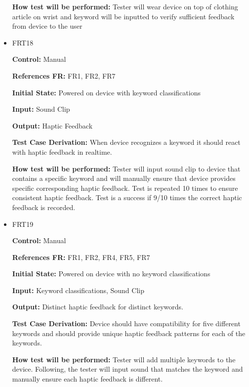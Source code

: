 \documentclass[12pt, titlepage]{article}
\begin{document}
\begin{itemize}
\textbf{How test will be performed:} Tester will wear device on top of clothing article on wrist and keyword will be inputted to verify sufficient feedback from device to the user


\item{FRT18}

\textbf{Control:} Manual 

\textbf{References FR:} FR1, FR2, FR7 					

\textbf{Initial State:} Powered on device with keyword classifications
					
\textbf{Input:} Sound Clip
					
\textbf{Output:} Haptic Feedback

\textbf{Test Case Derivation:} When device recognizes a keyword it should react with haptic feedback in realtime.
					
\textbf{How test will be performed:} Tester will input sound clip to device that contains a specific keyword and will manually ensure that device provides specific corresponding haptic feedback. Test is repeated 10 times to ensure consistent haptic feedback. Test is a success if 9/10 times the correct haptic feedback is recorded.


\item{FRT19}

\textbf{Control:} Manual

\textbf{References FR:} FR1, FR2, FR4, FR5, FR7 					

\textbf{Initial State:} Powered on device with no keyword classifications
					
\textbf{Input:} Keyword classifications, Sound Clip
					
\textbf{Output:} Distinct haptic feedback for distinct keywords.

\textbf{Test Case Derivation:} Device should have compatibility for five different keywords and should provide unique haptic feedback patterns for each of the keywords.
					
\textbf{How test will be performed:} Tester will add multiple keywords to the device. Following, the tester will input sound that matches the keyword and manually ensure each haptic feedback is different.



\end{itemize}
\end{document}
